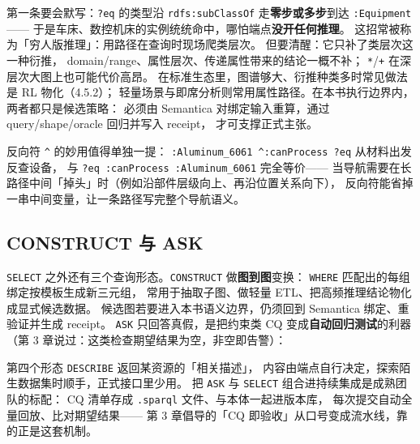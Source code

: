 第一条要会默写：\texttt{?eq} 的类型沿 \texttt{rdfs:subClassOf}
走\textbf{零步或多步}到达 \texttt{:Equipment}——
于是车床、数控机床的实例统统命中，哪怕端点\textbf{没开任何推理}。
这招常被称为「穷人版推理」：用路径在查询时现场爬类层次。
但要清醒：它只补了类层次这一种衍推，
domain/range、属性层次、传递属性带来的结论一概不补；
\texttt{*}/\texttt{+} 在深层次大图上也可能代价高昂。
在标准生态里，图谱够大、衍推种类多时常见做法是 RL 物化（4.5.2）；
轻量场景与即席分析则常用属性路径。在本书执行边界内，两者都只是候选策略：
必须由 Semantica 对绑定输入重算，通过 query/shape/oracle 回归并写入 receipt，
才可支撑正式主张。

反向符 \texttt{\^{}} 的妙用值得单独一提：
\texttt{:Aluminum\_6061 \^{}:canProcess ?eq} 从材料出发反查设备，
与 \texttt{?eq :canProcess :Aluminum\_6061} 完全等价——
当导航需要在长路径中间「掉头」时（例如沿部件层级向上、再沿位置关系向下），
反向符能省掉一串中间变量，让一条路径写完整个导航语义。

\subsection{CONSTRUCT 与 ASK}

\texttt{SELECT} 之外还有三个查询形态。\texttt{CONSTRUCT} 做\textbf{图到图}变换：
\texttt{WHERE} 匹配出的每组绑定按模板生成新三元组，
常用于抽取子图、做轻量 ETL、把高频推理结论物化成显式候选数据。
候选图若要进入本书语义边界，仍须回到 Semantica 绑定、重验证并生成 receipt。
\texttt{ASK} 只回答真假，是把约束类 CQ 变成\textbf{自动回归测试}的利器
（第 3 章说过：这类检查期望结果为空，非空即告警）：

\begin{codebox}
\codeline{\textcolor{cmtgray}{\#\ CONSTRUCT：把「设备\ \(\rightarrow\)\ 所在单元中文名」固化为新图}}
\codeblank{}
\codeline{\textcolor{cmtgray}{\#\ ASK：还有没有位置的设备吗？期望\ false，true\ 即数据告警}}
\end{codebox}

第四个形态 \texttt{DESCRIBE} 返回某资源的「相关描述」，
内容由端点自行决定，探索陌生数据集时顺手，正式接口里少用。
把 \texttt{ASK} 与 \texttt{SELECT} 组合进持续集成是成熟团队的标配：
CQ 清单存成 \texttt{.sparql} 文件、与本体一起进版本库，
每次提交自动全量回放、比对期望结果——
第 3 章倡导的「CQ 即验收」从口号变成流水线，靠的正是这套机制。

